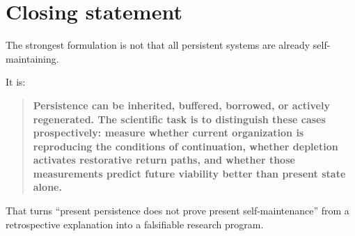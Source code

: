 \documentclass[11pt,a4paper]{article}
\begin{document}
\section*{Closing statement}

The strongest formulation is not that all persistent systems are already self-maintaining.

It is:

\begin{quote}
\textbf{Persistence can be inherited, buffered, borrowed, or actively regenerated. The scientific task is to distinguish these cases prospectively: measure whether current organization is reproducing the conditions of continuation, whether depletion activates restorative return paths, and whether those measurements predict future viability better than present state alone.}
\end{quote}

That turns ``present persistence does not prove present self-maintenance'' from a retrospective explanation into a falsifiable research program.
\end{document}
